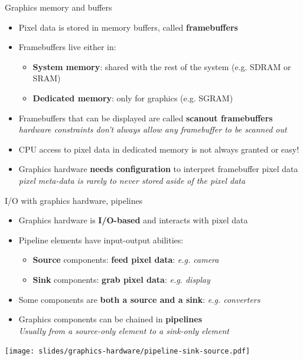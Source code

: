 \begin{frame}{Graphics memory and buffers}
  \begin{itemize}
  \item Pixel data is stored in memory buffers, called \textbf{framebuffers}
  \item Framebuffers live either in:
    \begin{itemize}
    \item \textbf{System memory}: shared with the rest of the system (e.g. SDRAM or SRAM)
    \item \textbf{Dedicated memory}: only for graphics (e.g. SGRAM)
    \end{itemize}
  \item Framebuffers that can be displayed are called \textbf{scanout framebuffers}\\
  \textit{hardware constraints don't always allow any framebuffer to be scanned out}
  \item CPU access to pixel data in dedicated memory is not always granted or easy!
  \item Graphics hardware \textbf{needs configuration} to interpret framebuffer pixel data\\
    \textit{pixel meta-data is rarely to never stored aside of the pixel data}
  \end{itemize}
\end{frame}

\begin{frame}{I/O with graphics hardware, pipelines}
  \begin{itemize}
  \item Graphics hardware is \textbf{I/O-based} and interacts with pixel data
  \item Pipeline elements have input-output abilities:
    \begin{itemize}
    \item \textbf{Source} components: \textbf{feed pixel data}: \textit{e.g. camera}
    \item \textbf{Sink} components: \textbf{grab pixel data}: \textit{e.g. display}
    \end{itemize}
  \item Some components are \textbf{both a source and a sink}: \textit{e.g. converters}
  \item Graphics components can be chained in \textbf{pipelines}\\
    \textit{Usually from a source-only element to a sink-only element}
  \end{itemize}

  \vspace{-2em}
  \begin{center}
  \texttt{[image: slides/graphics-hardware/pipeline-sink-source.pdf]}
  \end{center}
\end{frame}

